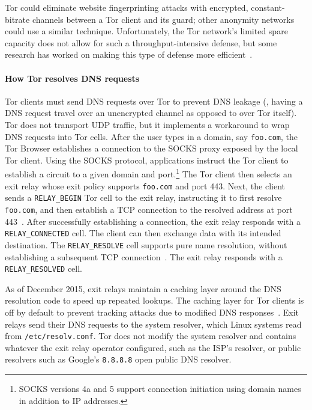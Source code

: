 Tor could eliminate website fingerprinting
attacks with encrypted, constant-bitrate channels between a Tor client and
its guard; other anonymity networks could use a similar technique.
Unfortunately, the Tor network's limited spare capacity does not
allow for such a throughput-intensive defense, but some research has
worked on making this type of defense
more efficient~\cite{Cai2014a,DBLP:journals/corr/JuarezIPDW15,WangThesis,adapativepadding}.

\paragraph{How Tor resolves DNS requests}
Tor clients must send DNS requests over Tor to prevent DNS {leakage}
(\ie, having a
DNS request travel over an unencrypted channel as opposed to over Tor
itself).  Tor does not transport UDP
traffic, but it implements a workaround to wrap DNS requests into Tor cells.
After the user types in a domain, say {\tt foo.com}, the Tor Browser establishes
a connection to the SOCKS proxy exposed by the local Tor client.  Using the
SOCKS protocol, applications instruct the Tor client to establish a circuit to a
given domain and port.\footnote{SOCKS versions 4a and 5 support connection
initiation using domain names in addition to IP addresses.} The Tor client then
selects an exit relay whose exit policy supports {\tt foo.com} and port 443.
Next, the client sends a \texttt{RELAY\_BEGIN} Tor cell to the exit relay,
instructing it to first resolve {\tt foo.com}, and then establish a TCP
connection to the resolved
address at port 443~\cite[\S~6.2]{tor-spec}.  After successfully establishing a
connection, the exit relay responds with a \texttt{RELAY\_CONNECTED}
cell.  The client can then exchange data with its intended
destination.  The \texttt{RELAY\_RESOLVE} cell supports pure name resolution,
without establishing a subsequent TCP connection~\cite[\S~6.4]{tor-spec}.  The
exit relay responds with a \texttt{RELAY\_RESOLVED} cell.

As of December 2015, exit relays maintain a caching layer
around the DNS resolution code to speed up repeated lookups.
The caching layer for Tor clients is off by default to prevent tracking attacks
due to modified DNS responses~\cite{nolocalcache}.
Exit relays send
their DNS requests to the system resolver, which Linux systems read from
\texttt{/etc/resolv.conf}.  Tor does not modify the system resolver and
contains whatever the exit relay operator configured, such as the ISP's resolver,
or public resolvers such as Google's {\tt 8.8.8.8} open public DNS resolver.
